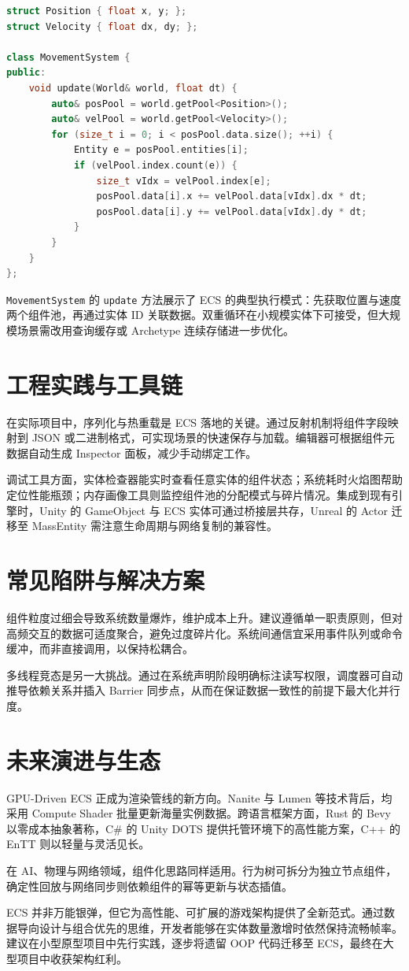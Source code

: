 \begin{lstlisting}[language=cpp]
struct Position { float x, y; };
struct Velocity { float dx, dy; };

class MovementSystem {
public:
    void update(World& world, float dt) {
        auto& posPool = world.getPool<Position>();
        auto& velPool = world.getPool<Velocity>();
        for (size_t i = 0; i < posPool.data.size(); ++i) {
            Entity e = posPool.entities[i];
            if (velPool.index.count(e)) {
                size_t vIdx = velPool.index[e];
                posPool.data[i].x += velPool.data[vIdx].dx * dt;
                posPool.data[i].y += velPool.data[vIdx].dy * dt;
            }
        }
    }
};
\end{lstlisting}
\texttt{MovementSystem} 的 \texttt{update} 方法展示了 ECS 的典型执行模式：先获取位置与速度两个组件池，再通过实体 ID 关联数据。双重循环在小规模实体下可接受，但大规模场景需改用查询缓存或 Archetype 连续存储进一步优化。\par
\chapter{工程实践与工具链}
在实际项目中，序列化与热重载是 ECS 落地的关键。通过反射机制将组件字段映射到 JSON 或二进制格式，可实现场景的快速保存与加载。编辑器可根据组件元数据自动生成 Inspector 面板，减少手动绑定工作。\par
调试工具方面，实体检查器能实时查看任意实体的组件状态；系统耗时火焰图帮助定位性能瓶颈；内存画像工具则监控组件池的分配模式与碎片情况。集成到现有引擎时，Unity 的 GameObject 与 ECS 实体可通过桥接层共存，Unreal 的 Actor 迁移至 MassEntity 需注意生命周期与网络复制的兼容性。\par
\chapter{常见陷阱与解决方案}
组件粒度过细会导致系统数量爆炸，维护成本上升。建议遵循单一职责原则，但对高频交互的数据可适度聚合，避免过度碎片化。系统间通信宜采用事件队列或命令缓冲，而非直接调用，以保持松耦合。\par
多线程竞态是另一大挑战。通过在系统声明阶段明确标注读写权限，调度器可自动推导依赖关系并插入 Barrier 同步点，从而在保证数据一致性的前提下最大化并行度。\par
\chapter{未来演进与生态}
GPU-Driven ECS 正成为渲染管线的新方向。Nanite 与 Lumen 等技术背后，均采用 Compute Shader 批量更新海量实例数据。跨语言框架方面，Rust 的 Bevy 以零成本抽象著称，C\#{} 的 Unity DOTS 提供托管环境下的高性能方案，C++ 的 EnTT 则以轻量与灵活见长。\par
在 AI、物理与网络领域，组件化思路同样适用。行为树可拆分为独立节点组件，确定性回放与网络同步则依赖组件的幂等更新与状态插值。\par
ECS 并非万能银弹，但它为高性能、可扩展的游戏架构提供了全新范式。通过数据导向设计与组合优先的思维，开发者能够在实体数量激增时依然保持流畅帧率。建议在小型原型项目中先行实践，逐步将遗留 OOP 代码迁移至 ECS，最终在大型项目中收获架构红利。\par
